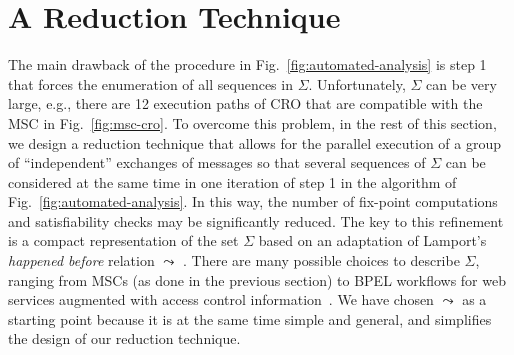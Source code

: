 \documentclass[conference]{llncs}
\newcommand{\CRO}{CRO}
\begin{document}
{\section{A Reduction Technique}  
\label{sec:verification}
The main drawback of the procedure in Fig.~\ref{fig:automated-analysis}
is step 1 that forces the enumeration of all sequences in $\Sigma$.
Unfortunately, $\Sigma$ can be very large, e.g., there are 12 execution paths of \CRO{}
that are compatible with the MSC in Fig.~\ref{fig:msc-cro}.
To overcome this problem, in the rest of
this section, we design a reduction technique that allows for the
parallel execution of a group of ``independent'' exchanges of messages
so that several sequences of $\Sigma$ can be considered at the same time
in one iteration of step 1 in the algorithm of
Fig.~\ref{fig:automated-analysis}. In this way, the number of fix-point
computations and satisfiability checks may be significantly reduced. The
key to this refinement is a compact representation of the set $\Sigma$
based on an adaptation of Lamport's \emph{happened before} relation
$\leadsto$ \cite{lamport-comm}. There are many possible choices to
describe $\Sigma$, ranging from MSCs (as done in the previous section)
to BPEL workflows for web services augmented with access control
information~\cite{pacibertino}. We have chosen $\leadsto$ as a starting
point because it is at the same time simple and general, and simplifies
the design of our reduction technique.

}
\end{document}
